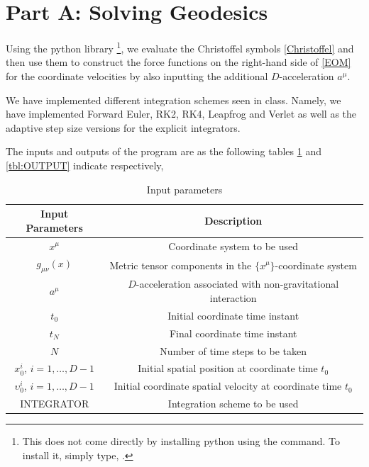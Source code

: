 \section{Part A: Solving Geodesics}
\label{Sec2}

Using the python library \footnote{This does not come directly by installing python using the  command. To install it, simply type, .}, we evaluate the Christoffel symbols \eqref{Christoffel} and then use them to construct the force functions on the right-hand side of \eqref{EOM} for the coordinate velocities by also inputting the additional $D$-acceleration $a^{\mu}$.

We have implemented different integration schemes seen in class. Namely, we have implemented Forward Euler, RK2, RK4, Leapfrog and Verlet as well as the adaptive step size versions for the explicit integrators.

The inputs and outputs of the program are as the following tables \ref{tbl:INPUT} and \ref{tbl:OUTPUT} indicate respectively,
\begin{table}[H]
	\centering
	\begin{tabular}{|c|c|}
		\hline
		Input Parameters & Description \\
		\hline
		\hline
		$x^{\mu}$ & Coordinate system to be used \\
		\hline
		$g_{\mu\nu}(x)$ & Metric tensor components in the $\{x^{\mu}\}$-coordinate system \\
		\hline
		$a^{\mu}$ & $D$-acceleration associated with non-gravitational interaction \\
		\hline
		$t_0$ & Initial coordinate time instant \\
		\hline
		$t_{N}$ & Final coordinate time instant \\
		\hline
		$N$ & Number of time steps to be taken \\
		\hline
		$x^{i}_0$, $i=1,\dots,D-1$ & Initial spatial position at coordinate time $t_0$\\
		\hline
		$\upsilon^{i}_0$, $i=1,\dots,D-1$ & Initial coordinate spatial velocity at coordinate time $t_0$\\
		\hline
		INTEGRATOR & Integration scheme to be used \\
		\hline
	\end{tabular}
	\caption{Input parameters}
	\label{tbl:INPUT}
\end{table}

